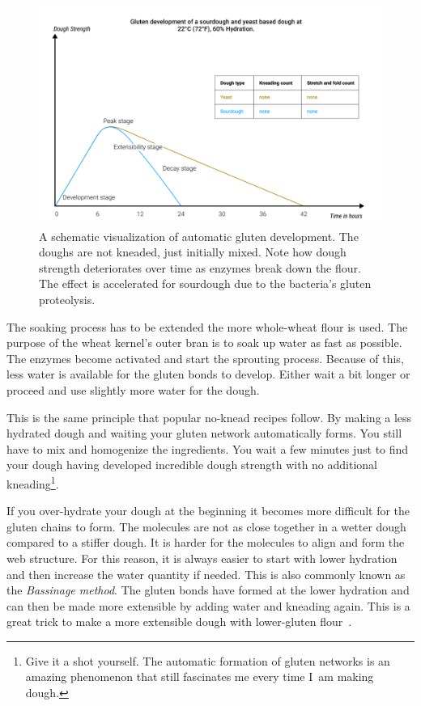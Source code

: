 \begin{figure}[!htb]
  \includegraphics[width=\textwidth]{dough-strength-sourdough-yeast}
  \caption[Dough strength over time without kneading]{A schematic
      visualization of automatic gluten development. The doughs are not
      kneaded, just initially mixed.  Note how dough strength deteriorates
      over time as enzymes break down the flour. The effect is accelerated for
      sourdough due to the bacteria's gluten proteolysis.}%
  \label{fig:wheat-yeast-sourdough-degradation}
\end{figure}

The soaking process has to be extended the more whole-wheat flour is used.
The purpose of the wheat kernel's outer bran is to soak up water as fast
as possible. The enzymes become activated and start the sprouting process.
Because of this, less water is available for the gluten bonds to develop.
Either wait a bit longer or proceed and use slightly more water for
the dough.

This is the same principle that popular no-knead recipes follow. By making a less
hydrated dough and waiting your gluten network automatically forms. You still
have to mix and homogenize the ingredients. You wait a few minutes just to
find your dough having developed incredible dough strength with no additional
kneading\footnote{Give it a shot yourself. The automatic formation of gluten
networks is an amazing phenomenon that still fascinates me every time I~am
making dough.}.

If you over-hydrate your dough at the beginning it becomes more difficult
for the gluten chains to form. The molecules are not as close together in
a wetter dough compared to a stiffer dough. It is harder for the molecules
to align and form the web structure. For this reason, it is always easier
to start with lower hydration and then increase the water quantity if needed.
This is also commonly known as the \emph{Bassinage method}. The gluten
bonds have formed at the lower hydration and can then be made more extensible
by adding water and kneading again. This is a great trick to make
a more extensible dough with lower-gluten flour~\cite{bassinage+technique}.


